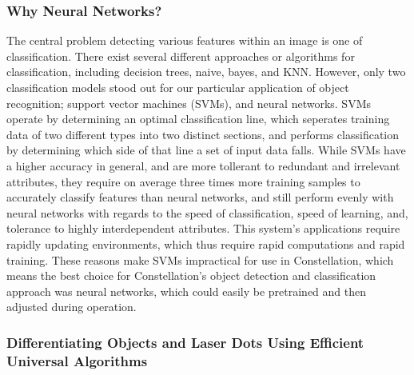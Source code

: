 \subsubsection{Why Neural Networks?}
The central problem detecting various features within an image is one of classification. There exist several different approaches or algorithms for classification, including decision trees, naive, bayes, and KNN. However, only two classification models stood out for our particular application of object recognition; support vector machines (SVMs), and neural networks. SVMs operate by determining an optimal classification line, which seperates training data of two different types into two distinct sections, and performs classification by determining which side of that line a set of input data falls. While SVMs have a higher accuracy in general, and are more tollerant to redundant and irrelevant attributes, they require on average three times more training samples to accurately classify features than neural networks, and still perform evenly with neural networks with regards to the speed of classification, speed of learning, and, tolerance to highly interdependent attributes. This system's applications require rapidly updating environments, which thus require rapid computations and rapid training. These reasons make SVMs impractical for use in Constellation, which means the best choice for Constellation's object detection and classification approach was neural networks, which could easily be pretrained and then adjusted during operation.
\subsubsection{Differentiating Objects and Laser Dots Using Efficient Universal Algorithms}